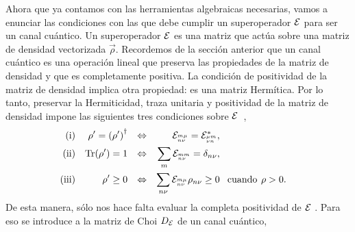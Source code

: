 Ahora que ya contamos con las herramientas algebraicas necesarias, 
vamos a enunciar las condiciones con las que debe cumplir un 
superoperador $\mathcal{E}$ para ser un canal cuántico. Un superoperador 
$\mathcal{E}$ es una matriz que actúa sobre una matriz de densidad vectorizada
$\vec{\rho}$.
Recordemos de la sección anterior que un canal cuántico 
es una operación lineal que preserva las propiedades de 
la matriz de densidad y que es completamente positiva.
La condición de positividad de la matriz de densidad implica 
otra propiedad: es una matriz Hermítica. 
Por lo tanto, preservar la Hermiticidad, traza unitaria y positividad 
de la matriz de densidad impone las siguientes tres condiciones 
sobre $\mathcal{E}$~\cite{bengtsson_zyczkowski_2017},
\begin{align}
\text{(i)}&& \rho'=\qty(\rho')^{\dagger}&&\Leftrightarrow
    && \mathcal{E}_{{}^{m\mu}_{n\nu}}=\mathcal{E}_{{}^{\mu m}_{\nu n}}^*,&&
    \label{eq:H-condition}\\
\text{(ii)}&&\Tr(\rho')=1
    &&\Leftrightarrow&&  \sum_{m}\mathcal{E}_{{}^{mm}_{n\nu}}=\delta_{n\nu},
    \label{eq:Tr-condition}\\     
\text{(iii)}&&\rho'\geq0
    &&\Leftrightarrow&&  \sum_{n\nu}\mathcal{E}_{{{}^{m\mu}_{n\nu}}}\rho_{n\nu}\geq0 &
    \text{\hspace{8pt}cuando\hspace{4pt}} \rho>0.
    \label{eq:positivity-condition}
\end{align}
De esta manera, sólo nos hace falta evaluar la completa positividad de $\mathcal{E}$
. 
Para eso se introduce a la matriz de Choi $D_{\mathcal{E}}$ de un canal cuántico,
